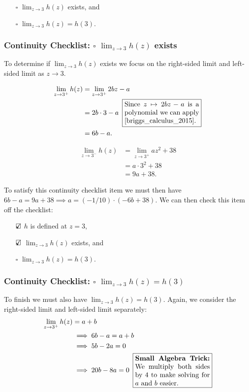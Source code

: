 \documentclass{article}
\theoremstyle{definition}
\begin{document}
\begin{Solution}
\begin{itemize}
    \item[$\square$]
      $\lim_{z \to 3} h(z)$ exists, and

    \item[$\square$]  
      $\lim_{z \to 3} h(z) = h(3)$.
  \end{itemize}

  \subsubsection*{Continuity Checklist: $\square$ $\lim_{z \to 3} h(z)$ exists}
  To determine if $\lim_{z \to 3} h(z)$ exists we focus on the right-sided limit and left-sided limit as $z \to 3$.

  \begin{align*}
    \lim_{z \to 3^+} h(z) &= \lim_{z \to 3^+} 2bz - a\\
    &= 2b\cdot 3 - a \hspace{0.5em}\fbox{\parbox[c][]{1.5in}{Since $z \mapsto 2bz-a$ is a polynomial we can apply \cite[Theorem 2.4, page 71]{briggs_calculus_2015}.}} \\
    &= 6b - a.
  \end{align*}

  \begin{align*}
    \lim_{z \to 3^-} h(z) &= \lim_{z \to 3^+} az^2 + 38\\
    &= a\cdot 3^2 +38 \\
    &= 9a + 38.
  \end{align*}

  To satisfy this continuity checklist item we must then have $6b - a = 9a + 38 \implies a = (-1/10) \cdot (-6b + 38)$.
  We can then check this item off the checklist:
  \begin{itemize}
    \item[$\text{\rlap{$\checkmark$}}\square$]
      $h$ is defined at $z = 3$,

    \item[$\text{\rlap{$\checkmark$}}\square$]
      $\lim_{z \to 3} h(z)$ exists, and

    \item[$\square$]  
      $\lim_{z \to 3} h(z) = h(3)$.
  \end{itemize}

  \subsubsection*{Continuity Checklist: $\square$ $\lim_{z \to 3} h(z) = h(3)$}
  To finish we must also have $\lim_{z \to 3} h(z) = h(3)$.
  Again, we consider the right-sided limit and left-sided limit separately:
  \begin{align*}
    \lim_{z \to 3^+} h(z) &= a + b \\
    &\implies 6b - a = a + b \\
    &\implies 5b - 2a = 0\\
    &\implies 20b - 8a = 0 \hspace{0.5em}\fbox{\parbox[c][]{1.5in}{\textbf{Small Algebra Trick:} We multiply both sides by 4 to make solving for $a$ and $b$ easier.}}
  \end{align*}


\end{Solution}
\end{document}
